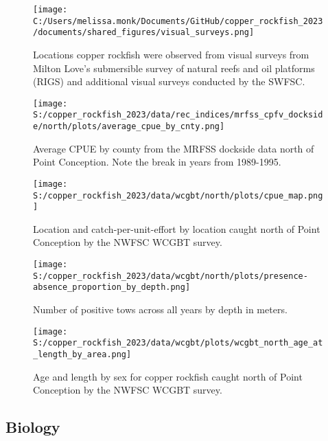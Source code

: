 \documentclass[11pt,
  english,
  letterpaper,
]{article}
\begin{document}
\pagebreak

\begin{figure}
\centering
\texttt{[image: C:/Users/melissa.monk/Documents/GitHub/copper\_rockfish\_2023/documents/shared\_figures/visual\_surveys.png]}
\caption{Locations copper rockfish were observed from visual surveys from Milton Love's submersible survey of natural reefs and oil platforms (RIGS) and additional visual surveys conducted by the SWFSC.\label{fig:visual-surveys}}
\end{figure}

\begin{figure}
\centering
\texttt{[image: S:/copper\_rockfish\_2023/data/rec\_indices/mrfss\_cpfv\_dockside/north/plots/average\_cpue\_by\_cnty.png]}
\caption{Average CPUE by county from the MRFSS dockside data north of Point Conception. Note the break in years from 1989-1995.\label{fig:mrfss-cpue-county}}
\end{figure}

\begin{figure}
\centering
\texttt{[image: S:/copper\_rockfish\_2023/data/wcgbt/north/plots/cpue\_map.png]}
\caption{Location and catch-per-unit-effort by location caught north of Point Conception by the NWFSC WCGBT survey.\label{fig:wcgbt-cpue}}
\end{figure}

\pagebreak

\begin{figure}
\centering
\texttt{[image: S:/copper\_rockfish\_2023/data/wcgbt/north/plots/presence-absence\_proportion\_by\_depth.png]}
\caption{Number of positive tows across all years by depth in meters.\label{fig:wcgbt-depth}}
\end{figure}

\pagebreak

\begin{figure}
\centering
\texttt{[image: S:/copper\_rockfish\_2023/data/wcgbt/plots/wcgbt\_north\_age\_at\_length\_by\_area.png]}
\caption{Age and length by sex for copper rockfish caught north of Point Conception by the NWFSC WCGBT survey.\label{fig:wcgbt-len-age}}
\end{figure}

\pagebreak

\hypertarget{biology}{%
\subsection{Biology}\label{biology}}
\end{document}
